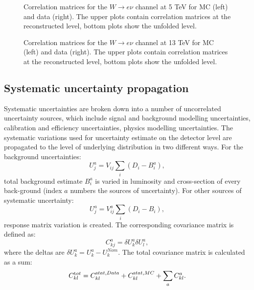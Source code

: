  \begin{figure}[pt]
 	\caption{Correlation matrices  for the $W\rightarrow e\nu$ channel at 5 TeV for MC (left) and data (right). The upper plots contain correlation matrices at the reconstructed level, bottom plots show the unfolded level.}
 	\label{fig:bootstrap_5TeV}
 \end{figure}
  \begin{figure}[pt]
 	\caption{Correlation matrices  for the $W\rightarrow e\nu$ channel at 13 TeV for MC (left) and data (right). The upper plots contain correlation matrices at the reconstructed level, bottom plots show the unfolded level.}
 	\label{fig:bootstrap_13TeV}
 \end{figure}
 
\subsection{Systematic uncertainty propagation}
Systematic uncertainties are broken down into a number of uncorrelated uncertainty sources, which include signal and background modelling uncertainties, calibration and efficiency uncertainties, physics modelling uncertainties. The systematic variations used for uncertainty estimate on the detector level are propagated to the level of underlying distribution in two different ways. For the background uncertainties:
 \begin{equation*}
U_j^{a} = V_{ij}\sum_{i} (D_i - B^a_i),
\end{equation*}
total background estimate $B^a_i$ is varied in luminosity and cross-section of every back-ground (index $a$ numbers the sources of uncertainty). For other sources of systematic uncertainty:
 \begin{equation*}
U_j^{a} = V_{ij}^a \sum_{i} (D_i - B_i),
\end{equation*}
response matrix variation is created. The corresponding covariance matrix is defined as:
 \begin{equation*}
C_{kj}^{a} = \delta U^a_k \delta U^a_l,
\end{equation*}
where the deltas are $\delta U^a_k=U^a_k-U^{Nom}_k$.
The total covariance matrix is calculated as a sum:
\begin{equation}
C_{kl}^{\textrm tot} = C_{kl}^{\textrm stat,Data} + C_{kl}^{\textrm stat,MC} + \sum_a C_{kl}^a.
\end{equation}	

